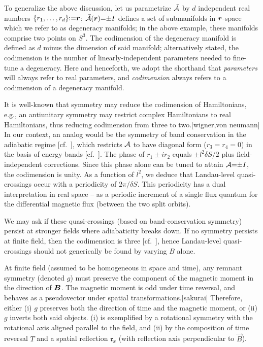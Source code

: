 \documentclass[aps, prb, showpacs, twocolumn, notitlepage, superscriptaddress]{revtex4-1}
\begin{document}
 
 To generalize the above discussion, let us parametrize ${\cal \bar{A}}$ by $d$ independent real numbers  $\{r_1,\ldots,r_{d}\}{:}{=}\boldsymbol{r} $;  ${\cal \bar{A}}(\boldsymbol{r}){=}{\pm}I$ defines a set of submanifolds in $\boldsymbol{r}$-space which we refer to as degeneracy manifolds; in the above example, these manifolds comprise two points on $S^3$. The codimension of the degeneracy manifold  is defined as $d$ minus the dimension of said manifold; alternatively stated, the codimension is the number of linearly-independent parameters needed to fine-tune a degeneracy. Here and henceforth, we adopt the shorthand that  \textit{parameters} will always refer to real parameters, and \textit{codimension} always refers to a codimension of a degeneracy manifold. 


It is well-known that symmetry may reduce the codimension of Hamiltonians, e.g., an antiunitary symmetry may restrict complex Hamiltonians to real Hamiltonians, thus reducing codimension from three to two.[wigner,von neumann] In our context, an analog would be the symmetry of band conservation in the adiabatic regime [cf.\ ], which restricts ${\cal A}$ to have diagonal form  ($r_3{=}r_4{=}0$) in the basis of energy bands [cf.\ ]. The phase of $r_1{\pm}ir_2$ equals ${\pm} l^2\delta S/2$ plus field-independent corrections. Since this  phase alone  can be  tuned to attain ${\cal A}{=}{\pm}I$, the codimension is unity. As a function of $l^2$, we deduce that Landau-level quasi-crossings occur  with a periodicity of $2\pi/\delta S$. This periodicity  has a dual interpretation  in real space -- as a periodic increment of a single flux quantum for  the differential magnetic flux (between the two split orbits).


We may ask if these quasi-crossings (based on band-conservation symmetry) persist at stronger fields where adiabaticity breaks down. If no symmetry persists at finite field, then the codimension is three [cf.\ ], hence Landau-level quasi-crossings should not generically be found by varying $B$ alone.

At finite field (assumed to be homogeneous in space and time), any remnant  symmetry (denoted $g$) must preserve the component of the magnetic moment in the direction of  $\boldsymbol{B}$. The magnetic moment is odd under time reversal, and behaves as a pseudovector under spatial transformations.[sakurai] Therefore, either (i) $g$  preserves both the direction of time and the magnetic moment, or (ii) $g$ inverts both said objects. (i) is exemplified by a rotational symmetry with the rotational axis aligned parallel to the field, and (ii) by the composition  of time reversal $T$ and a spatial reflection $\mathfrak{r}_x$ (with reflection axis perpendicular to $\vec{B}$). 
\end{document}
